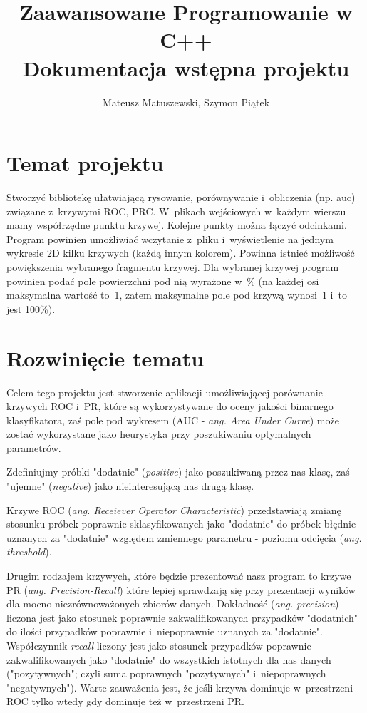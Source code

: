 \documentclass[12pt,a4paper,titlepage]{article}
\title{Zaawansowane Programowanie w C++\\Dokumentacja wstępna projektu}
\author{Mateusz Matuszewski, Szymon Piątek}
\begin{document}
\maketitle
\section{Temat projektu}
Stworzyć bibliotekę ułatwiającą rysowanie, porównywanie i~obliczenia (np. auc) związane z~krzywymi ROC, PRC. W~plikach wejściowych w~każdym wierszu mamy współrzędne punktu krzywej. Kolejne punkty można łączyć odcinkami. Program powinien umożliwiać wczytanie z~pliku i~wyświetlenie na jednym wykresie 2D kilku krzywych (każdą innym kolorem). Powinna istnieć możliwość powiększenia wybranego fragmentu krzywej. Dla wybranej krzywej program powinien podać pole powierzchni pod nią wyrażone w~\% (na każdej osi maksymalna wartość to~1, zatem maksymalne pole pod krzywą wynosi~1 i~to jest 100\%).
\section{Rozwinięcie tematu}
Celem tego projektu jest stworzenie aplikacji umożliwiającej porównanie krzywych ROC i~PR, które są wykorzystywane do oceny jakości binarnego klasyfikatora, zaś pole pod wykresem (AUC - \textit{ang. Area Under Curve}) może zostać wykorzystane jako heurystyka przy poszukiwaniu optymalnych parametrów.

Zdefiniujmy próbki "dodatnie" (\textit{positive}) jako poszukiwaną przez nas klasę, zaś "ujemne" (\textit{negative}) jako nieinteresującą nas drugą klasę.

Krzywe ROC (\textit{ang. Receiever Operator Characteristic}) przedstawiają zmianę stosunku próbek poprawnie sklasyfikowanych jako "dodatnie" do próbek błędnie uznanych za "dodatnie" względem zmiennego parametru - poziomu odcięcia (\textit{ang. threshold}).

Drugim rodzajem krzywych, które będzie prezentować nasz program to krzywe PR (\textit{ang. Precision-Recall}) które lepiej sprawdzają się przy prezentacji wyników dla mocno niezrównoważonych zbiorów danych. Dokładność (\textit{ang. precision}) liczona jest jako stosunek poprawnie zakwalifikowanych przypadków "dodatnich" do ilości przypadków poprawnie i~niepoprawnie uznanych za "dodatnie". Współczynnik \textit{recall} liczony jest jako stosunek przypadków poprawnie zakwalifikowanych jako "dodatnie" do wszystkich istotnych dla nas danych ("pozytywnych"; czyli suma poprawnych "pozytywnych" i~niepoprawnych "negatywnych"). Warte zauważenia jest, że jeśli krzywa dominuje w~przestrzeni ROC tylko wtedy gdy dominuje też w~przestrzeni PR.
\end{document}

